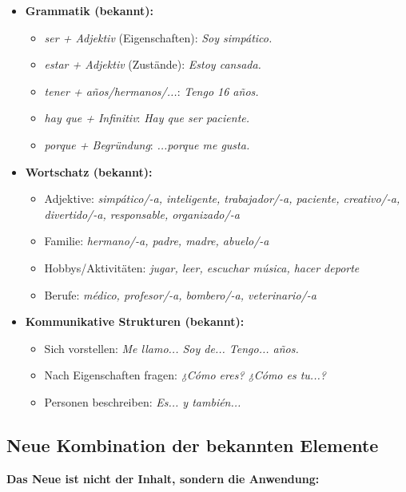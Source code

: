 \documentclass[11pt,a4paper]{article}
\begin{document}
\begin{itemize}
    \item \textbf{Grammatik (bekannt):}
    \begin{itemize}
        \item \textit{ser + Adjektiv} (Eigenschaften): \textit{Soy simpático.}
        \item \textit{estar + Adjektiv} (Zustände): \textit{Estoy cansada.}
        \item \textit{tener + años/hermanos/...}: \textit{Tengo 16 años.}
        \item \textit{hay que + Infinitiv}: \textit{Hay que ser paciente.}
        \item \textit{porque + Begründung}: \textit{...porque me gusta.}
    \end{itemize}

    \item \textbf{Wortschatz (bekannt):}
    \begin{itemize}
        \item Adjektive: \textit{simpático/-a, inteligente, trabajador/-a, paciente, creativo/-a, divertido/-a, responsable, organizado/-a}
        \item Familie: \textit{hermano/-a, padre, madre, abuelo/-a}
        \item Hobbys/Aktivitäten: \textit{jugar, leer, escuchar música, hacer deporte}
        \item Berufe: \textit{médico, profesor/-a, bombero/-a, veterinario/-a}
    \end{itemize}

    \item \textbf{Kommunikative Strukturen (bekannt):}
    \begin{itemize}
        \item Sich vorstellen: \textit{Me llamo... Soy de... Tengo... años.}
        \item Nach Eigenschaften fragen: \textit{¿Cómo eres? ¿Cómo es tu...?}
        \item Personen beschreiben: \textit{Es... y también...}
    \end{itemize}
\end{itemize}

\subsection{Neue Kombination der bekannten Elemente}

\textbf{Das Neue ist nicht der Inhalt, sondern die Anwendung:}
\end{document}
